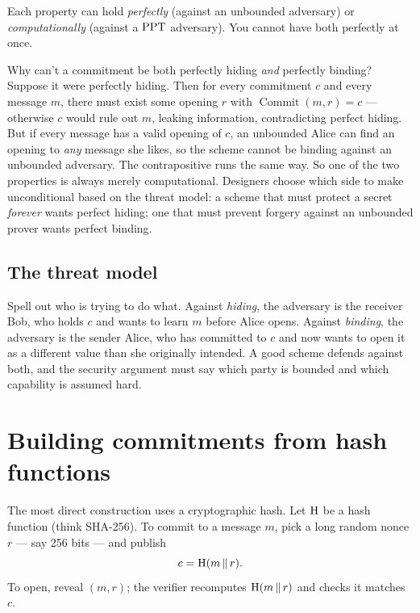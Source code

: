 Each property can hold \emph{perfectly} (against an unbounded adversary) or \emph{computationally} (against a $\mathrm{PPT}$ adversary). You cannot have both perfectly at once.

\begin{whybox}
Why can't a commitment be both perfectly hiding \emph{and} perfectly binding? Suppose it were perfectly hiding. Then for every commitment $c$ and every message $m$, there must exist some opening $r$ with $\operatorname{Commit}(m, r) = c$ --- otherwise $c$ would rule out $m$, leaking information, contradicting perfect hiding. But if every message has a valid opening of $c$, an unbounded Alice can find an opening to \emph{any} message she likes, so the scheme cannot be binding against an unbounded adversary. The contrapositive runs the same way. So one of the two properties is always merely computational. Designers choose which side to make unconditional based on the threat model: a scheme that must protect a secret \emph{forever} wants perfect hiding; one that must prevent forgery against an unbounded prover wants perfect binding.
\end{whybox}

\subsection{The threat model}
\label{ch32:threatmodel}

Spell out who is trying to do what. Against \emph{hiding}, the adversary is the receiver Bob, who holds $c$ and wants to learn $m$ before Alice opens. Against \emph{binding}, the adversary is the sender Alice, who has committed to $c$ and now wants to open it as a different value than she originally intended. A good scheme defends against both, and the security argument must say which party is bounded and which capability is assumed hard.

\section{Building commitments from hash functions}
\label{ch32:hashcommit}

The most direct construction uses a cryptographic hash. Let $\operatorname{H}$ be a hash function (think SHA-256). To commit to a message $m$, pick a long random nonce $r$ --- say 256 bits --- and publish
\[
  c = \operatorname{H}(m \,\|\, r).
\]
To open, reveal $(m, r)$; the verifier recomputes $\operatorname{H}(m \,\|\, r)$ and checks it matches $c$.

